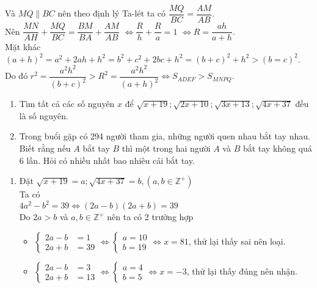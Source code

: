 \begin{ex}
{    Và $MQ \parallel BC$ nên theo định lý Ta-lét ta có $\dfrac{MQ}{BC}=\dfrac{AM}{AB}$.\\
    Nên $\dfrac{MN}{AH}+\dfrac{MQ}{BC}=\dfrac{BM}{BA}+\dfrac{AM}{AB}$
    $\Leftrightarrow \dfrac{R}{h}+\dfrac{R}{a}=1$
    $\Leftrightarrow R=\dfrac{ah}{a+h}$.\\
    Mặt khác $\left(a+h\right)^2=a^2+2ah+h^2=b^2+c^2+2bc+h^2=\left(b+c\right)^2+h^2>\left(b=c\right)^2$.\\
        Do đó $r^2=\dfrac{a^2h^2}{\left(b+c\right)^2}>R^2=\dfrac{a^2h^2}{\left(a+h\right)^2}\Leftrightarrow S_{ADEF}>S_{MNPQ}.$
    }
\end{ex}

\begin{ex}%
	\hfill
    \begin{enumerate}
    \item Tìm tất cả các số nguyên $x$ để $\sqrt{x+19};\sqrt{2x+10};\sqrt{3x+13};\sqrt{4x+37}$ đều là số nguyên.
    \item Trong buổi gặp có 294 người tham gia, những người quen nhau bắt tay nhau. Biết rằng nếu $A$ bắt tay $B$ thì một trong hai người $A$ và $B$ bắt tay không quá 6 lần. Hỏi có nhiều nhất bao nhiêu cái bắt tay.
    \end{enumerate}
\loigiai
    {
     \begin{enumerate}
    \item Đặt $\sqrt{x+19}=a;\sqrt{4x+37}=b,\left(a,b \in \mathbb{Z^+}\right)$\\
    		Ta có\\    	
    		$4a^2-b^2=39\Leftrightarrow \left(2a-b\right)\left(2a+b\right)=39$\\
    	Do $2a>b$ và $a,b \in \mathbb{Z^+}$	nên ta có 2 trường hợp
		   \begin{itemize}
   			 \item $\begin{cases}  2a-b &= 1 \\ 2a+b &= 39  \end{cases}\Leftrightarrow \begin{cases}a=10\\b=19 \end{cases}\Leftrightarrow x=81$, thử lại thấy sai nên loại.
    	     \item $\begin{cases} 2a-b &= 3 \\  2a+b &= 13  \end{cases}\Leftrightarrow \begin{cases}a=4\\b=5 \end{cases}\Leftrightarrow x=-3$, thử lại thấy đúng nên nhận.

\end{itemize}
\end{enumerate}}
\end{ex}

